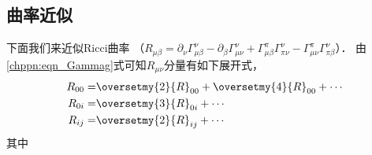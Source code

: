 \subsection{曲率近似}
下面我们来近似Ricci曲率
（$ R_{\mu\beta} = \partial_\nu \Gamma_{\mu\beta}^{\nu} -\partial_\beta \Gamma_{\mu\nu}^{\nu}
 + \Gamma_{\mu\beta}^{\pi} \Gamma_{\pi\nu}^{\nu} - \Gamma_{\mu\nu}^{\pi} \Gamma_{\pi\beta}^{\nu} $）．
由\eqref{chppn:eqn_Gammag}式可知$R_{\mu\nu}$分量有如下展开式，
\begin{subequations}
\begin{align}
    R_{00} =& \oversetmy{2}{R}_{00} + \oversetmy{4}{R}_{00} + \cdots \\
    R_{0i} =& \oversetmy{3}{R}_{0i} + \cdots \\
    R_{ij} =& \oversetmy{2}{R}_{ij} + \cdots
\end{align}
\end{subequations}
其中
